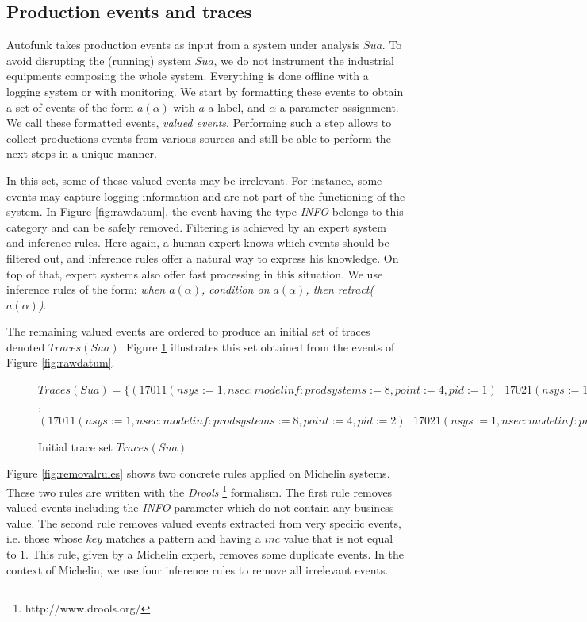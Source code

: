 \subsection{Production events and traces}
\label{part3:collecting}

Autofunk takes production events as input from a system under
analysis $Sua$. To avoid disrupting the (running) system $Sua$,
we do not instrument the industrial equipments composing the
whole system. Everything is done offline with a logging system or
with monitoring. We start by formatting these events to obtain a
set of events of the form $a(\alpha)$ with $a$ a label, and
$\alpha$ a parameter assignment. We call these formatted events,
\textit{valued events}. Performing such a step allows to collect
productions events from various sources and still be able to
perform the next steps in a unique manner.

In this set, some of these valued events may be irrelevant.  For
instance, some events may capture logging information and are not
part of the functioning of the system. In Figure
\ref{fig:rawdatum}, the event having the type \textit{INFO}
belongs to this category and can be safely removed. Filtering is
achieved by an expert system and inference rules. Here again, a
human expert knows which events should be filtered out, and
inference rules offer a natural way to express his knowledge. On
top of that, expert systems also offer fast processing in this
situation. We use inference rules of the form: \textit{when
$a(\alpha)$, condition on $a(\alpha)$, then
retract($a(\alpha)$)}.

The remaining valued events are ordered to produce an initial set
of traces denoted $Traces(Sua)$. Figure \ref{fig:tsua}
illustrates this set obtained from the events of Figure
\ref{fig:rawdatum}.

\begin{figure}
\begin{framed}
    $Traces(Sua) = \{
    (17011(nsys:=1,nsec:modelinf:prodsystems:=8,point:=4,pid:=1)\text{ }
    17021(nsys:=1,nsec:modelinf:prodsystems:=8,point:=4,tpoint:=8,pid:=1))$,
    $(17011(nsys:=1,nsec:modelinf:prodsystems:=8,point:=4,pid:=2)\text{ }
    17021(nsys:=1,nsec:modelinf:prodsystems:=8,point:=4,tpoint:=8,pid:=2)) \}$
\end{framed}

\caption{Initial trace set $Traces(Sua)$}
\label{fig:tsua}
\end{figure}

Figure \ref{fig:removalrules} shows two concrete rules applied on
Michelin systems. These two rules are written with the
\textit{Drools} \footnote{http://www.drools.org/} formalism.
The first rule removes valued events including the \textit{INFO}
parameter which do not contain any business value. The second
rule removes valued events extracted from very specific events,
i.e. those whose $key$ matches a pattern and having a $inc$ value
that is not equal to $1$. This rule, given by a Michelin expert,
removes some duplicate events. In the context of Michelin, we
use four inference rules to remove all irrelevant events.

